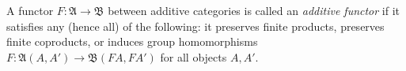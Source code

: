 A functor $F : \mathfrak{A} \to \mathfrak{B}$ between additive categories is called an \textit{additive functor} if it satisfies any (hence all) of the following: it preserves finite products, preserves finite coproducts, or induces group homomorphisms $F : \mathfrak{A}(A, A') \to \mathfrak{B}(FA, FA')$ for all objects $A, A'$.
